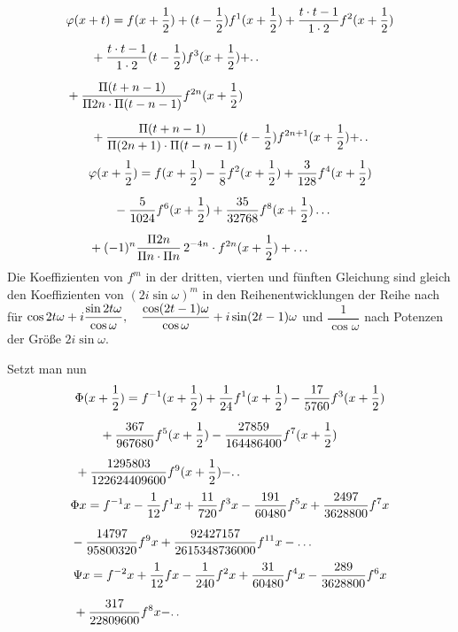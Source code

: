 \[
\begin{aligned}
&\varphi(x+t)={}f(x+\frac12)+(t-\frac12)f^{1}(x+\frac12)
+\frac{t\cdot t-1}{1\cdot2}f^{2}(x+\frac12)
\\[6pt]
&\qquad{}+\frac{t\cdot t-1}{1\cdot2}(t-\frac12)f^{3}(x+\frac12)+\ldotp\ldotp\\[6pt]
&+\frac{\Pi(t+n-1)}{\Pi 2n\cdot\Pi(t-n-1)}f^{2n}(x+\frac12)
\\[6pt]
&\qquad{}+\frac{\Pi(t+n-1)}{\Pi(2n+1)\cdot\Pi(t-n-1)}(t-\frac12)f^{2n+1}(x+\frac12)+\ldotp\ldotp
\end{aligned}
\]
\[
\begin{aligned}
&\varphi(x+\frac12)={}f(x+\frac12)-\frac18f^{2}(x+\frac12)
+\frac{3}{128}f^{4}(x+\frac12)\\[6pt]
&\qquad{}-\frac{5}{1024}f^{6}(x+\frac12)
+\frac{35}{32768}f^{8}(x+\frac12)\mathinner{.\,.\,.}\\[6pt]
&+(-1)^n\frac{\Pi 2n}{\Pi n\cdot\Pi n}\,2^{-4n}\cdot f^{2n}(x+\frac12)+\mathinner{.\,.\,.}
\end{aligned}
\]
Die Koeffizienten von $f^m$ in der dritten, vierten und fünften Gleichung sind gleich den Koeffizienten von
$(2i\sin\omega)^m$ in den Reihenentwicklungen der Reihe nach für
$\cos 2t\omega+i\dfrac{\sin 2t\omega}{\cos\omega},\allowbreak{}\allowbreak \quad
\dfrac{\cos(2t-\nobreak{}1)\omega}{\cos\omega}+i\sin(2t-\nobreak{}1)\omega$
und $\dfrac{1}{\cos\omega}$ nach Potenzen der Größe $2i\sin\omega$.
\par{}
Setzt man nun
\[
\begin{aligned}
&\Phi(x+\frac12)={}f^{-1}(x+\frac12)+\frac{1}{24}f^{1}(x+\frac12)
-\frac{17}{5760}f^{3}(x+\frac12)\\[6pt]
&\qquad{}+\frac{367}{967680}f^{5}(x+\frac12)
-\frac{27859}{164486400}f^{7}(x+\frac12)\\[6pt]
&+\frac{1295803}{122624409600}f^{9}(x+\frac12)-\ldotp\ldotp
\end{aligned}
\]
\[
\begin{aligned}
&\Phi x={}f^{-1}x-\frac{1}{12}f^{1}x+\frac{11}{720}f^{3}x
-\frac{191}{60480}f^{5}x+\frac{2497}{3628800}f^{7}x\\[6pt]
&-\frac{14797}{95800320}f^{9}x+\frac{92427157}{2615348736000}f^{11}x-\mathinner{.\,.\,.}
\end{aligned}
\]
\[
\begin{aligned}
&\Psi x={}f^{-2}x+\frac{1}{12}fx-\frac{1}{240}f^{2}x
+\frac{31}{60480}f^{4}x-\frac{289}{3628800}f^{6}x\\[6pt]
&+\frac{317}{22809600}f^{8}x-\ldotp\ldotp
\end{aligned}
\]
